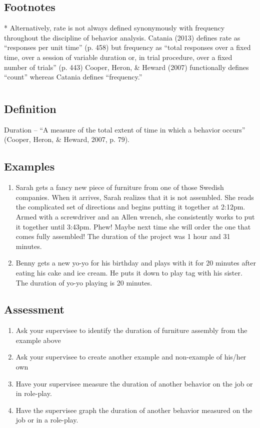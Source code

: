 \subsection{Footnotes}
* Alternatively, rate is not always defined synonymously with frequency throughout the discipline of behavior analysis. Catania (2013) defines rate as ``responses per unit time'' (p. 458) but frequency as ``total responses over a fixed time, over a session of variable duration or, in trial procedure, over a fixed number of trials'' (p. 443) Cooper, Heron, \& Heward (2007) functionally defines ``count'' whereas Catania defines ``frequency.''
%
%
%
%
%
%
%
%
%
%
%
\section{\fouraThree{}}
\subsection{Definition}
Duration – ``A measure of the total extent of time in which a behavior occurs'' (Cooper, Heron, \& Heward, 2007, p. 79).
%
\subsection{Examples}
\begin{enumerate}
\item Sarah gets a fancy new piece of furniture from one of those Swedish companies.  When it arrives, Sarah realizes that it is not assembled.  She reads the complicated set of directions and begins putting it together at 2:12pm. Armed with a screwdriver and an Allen wrench, she consistently works to put it together until 3:43pm. Phew! Maybe next time she will order the one that comes fully assembled! The duration of the project was 1 hour and 31 minutes.
\item Benny gets a new yo-yo for his birthday and plays with it for 20 minutes after eating his cake and ice cream. He puts it down to play tag with his sister. The duration of yo-yo playing is 20 minutes.
\end{enumerate}
%
\subsection{Assessment}
\begin{enumerate}
\item Ask your supervisee to identify the duration of furniture assembly from the example above
\item Ask your supervisee to create another example and non-example of his/her own
\item Have your supervisee measure the duration of another behavior on the job or in role-play.
\item Have the supervisee graph the duration of another behavior measured on the job or in a role-play.
\end{enumerate}
%
